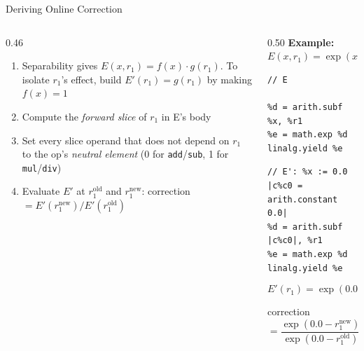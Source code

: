 \documentclass[10pt, aspectratio=169]{beamer}
\begin{document}
\begin{frame}[fragile]{Deriving Online Correction}
  \begin{columns}[c, onlytextwidth]
    \begin{column}{0.46\textwidth}
      \small
      \begin{enumerate}
        \setlength{\itemsep}{2mm}
        \item Separability gives $E(x, r_1) = f(x) \cdot g(r_1)$. To isolate
          $r_1$'s effect, build $E'(r_1) = g(r_1)$ by making $f(x) = 1$
        \item Compute the \emph{forward slice} of $r_1$ in E's body
        \item Set every slice operand that does not depend on $r_1$ to the op's
          \emph{neutral element} (0 for \texttt{add}/\texttt{sub}, 1 for
          \texttt{mul}/\texttt{div})
        \item Evaluate $E'$ at $r_1^{\text{old}}$ and $r_1^{\text{new}}$:
          correction $= E'(r_1^{\text{new}}) / E'(r_1^{\text{old}})$
      \end{enumerate}
    \end{column}
    \begin{column}{0.50\textwidth}
      \small
      \textbf{Example:} $E(x, r_1) = \exp(x - r_1)$\\[1mm]
      \begin{minipage}[t]{0.45\linewidth}
\begin{lstlisting}
// E

%d = arith.subf %x, %r1
%e = math.exp %d
linalg.yield %e
\end{lstlisting}
      \end{minipage}\hfill
      \begin{minipage}[t]{0.54\linewidth}
\begin{lstlisting}
// E': %x := 0.0
|c%c0 = arith.constant 0.0|
%d = arith.subf |c%c0|, %r1
%e = math.exp %d
linalg.yield %e
\end{lstlisting}
      \end{minipage}

      \vspace{2mm}
      \[
        E'(r_1) = \exp(0.0 - r_1)
      \]
      \colorbox{pro!15}{%
        \parbox{\dimexpr\linewidth-2\fboxsep\relax}{\centering\vspace{1mm}
          correction $= \dfrac{\exp(0.0 - r_1^{\text{new}})}{\exp(0.0 - r_1^{\text{old}})}$
          \vspace{1mm}}}
    \end{column}
  \end{columns}
\end{frame}
\end{document}
